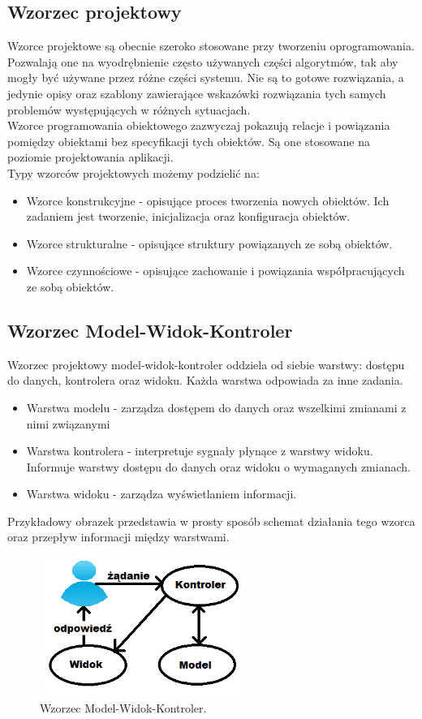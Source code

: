 \documentclass[12pt]{report}
\begin{document}
\subsection{Wzorzec projektowy}
	\indent Wzorce projektowe są obecnie szeroko stosowane przy tworzeniu oprogramowania. Pozwalają one na wyodrębnienie często używanych części algorytmów, tak aby mogły być używane przez różne części systemu. Nie są to gotowe rozwiązania, a jedynie opisy oraz szablony zawierające wskazówki rozwiązania tych samych problemów występujących w różnych sytuacjach. \\
	\indent Wzorce programowania obiektowego zazwyczaj pokazują relacje i powiązania pomiędzy obiektami bez specyfikacji tych obiektów. Są one stosowane na poziomie projektowania aplikacji. \\
	\indent Typy wzorców projektowych możemy podzielić na:
	\begin{itemize}
		\item{Wzorce konstrukcyjne - opisujące proces tworzenia nowych obiektów. Ich zadaniem jest tworzenie, inicjalizacja oraz konfiguracja obiektów.}
		\item{Wzorce strukturalne - opisujące struktury powiązanych ze sobą obiektów.}
		\item{Wzorce czynnościowe - opisujące zachowanie i powiązania współpracujących ze sobą obiektów.}
	 \end{itemize} 
\subsection{Wzorzec Model-Widok-Kontroler}
	\indent Wzorzec projektowy model-widok-kontroler oddziela od siebie warstwy: dostępu do danych, kontrolera oraz widoku. Każda warstwa odpowiada za inne zadania.
	\begin{itemize}
	\item Warstwa modelu - zarządza dostępem do danych oraz wszelkimi zmianami z nimi związanymi
	\item Warstwa kontrolera - interpretuje sygnały płynące z warstwy widoku. Informuje warstwy dostępu do danych oraz widoku o wymaganych zmianach.
	\item Warstwa widoku - zarządza wyświetlaniem informacji. 
	\end{itemize}
Przykładowy obrazek przedstawia w prosty sposób schemat działania tego wzorca oraz przepływ informacji między warstwami. \\
\begin{figure}[h]
	\centering
	\includegraphics[width=0.6\textwidth]{images/mvc.png}
	\caption{Wzorzec Model-Widok-Kontroler.}
\end{figure}
\FloatBarrier
\end{document}
